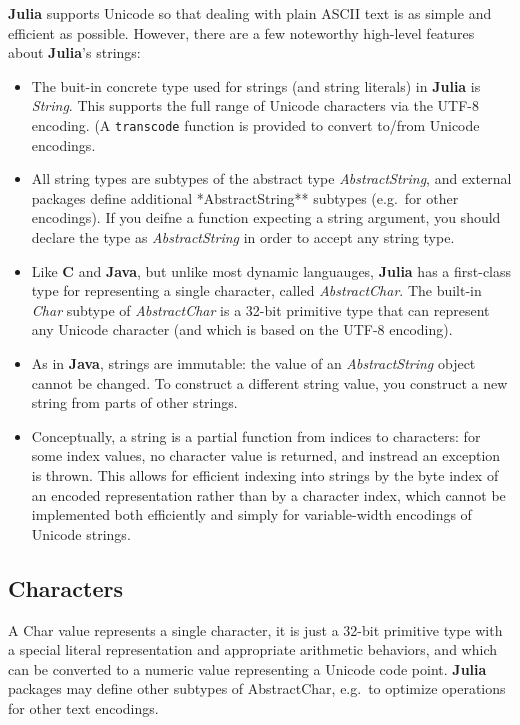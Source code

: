 \documentclass[
]{article}
\providecommand{\tightlist}{%
  \setlength{\itemsep}{0pt}\setlength{\parskip}{0pt}}
\begin{document}
\textbf{Julia} supports Unicode so that dealing with plain ASCII text is
as simple and efficient as possible. However, there are a few noteworthy
high-level features about \textbf{Julia}'s strings:

\begin{itemize}
\tightlist
\item
  The buit-in concrete type used for strings (and string literals) in
  \textbf{Julia} is \emph{String}. This supports the full range of
  Unicode characters via the UTF-8 encoding. (A \texttt{transcode}
  function is provided to convert to/from Unicode encodings.
\item
  All string types are subtypes of the abstract type
  \emph{AbstractString}, and external packages define additional
  *AbstractString** subtypes (e.g.~for other encodings). If you deifne a
  function expecting a string argument, you should declare the type as
  \emph{AbstractString} in order to accept any string type.
\item
  Like \textbf{C} and \textbf{Java}, but unlike most dynamic languauges,
  \textbf{Julia} has a first-class type for representing a single
  character, called \emph{AbstractChar}. The built-in \emph{Char}
  subtype of \emph{AbstractChar} is a 32-bit primitive type that can
  represent any Unicode character (and which is based on the UTF-8
  encoding).
\item
  As in \textbf{Java}, strings are immutable: the value of an
  \emph{AbstractString} object cannot be changed. To construct a
  different string value, you construct a new string from parts of other
  strings.
\item
  Conceptually, a string is a partial function from indices to
  characters: for some index values, no character value is returned, and
  instread an exception is thrown. This allows for efficient indexing
  into strings by the byte index of an encoded representation rather
  than by a character index, which cannot be implemented both
  efficiently and simply for variable-width encodings of Unicode
  strings.
\end{itemize}

\hypertarget{characters}{%
\subsection{Characters}\label{characters}}

A Char value represents a single character, it is just a 32-bit
primitive type with a special literal representation and appropriate
arithmetic behaviors, and which can be converted to a numeric value
representing a Unicode code point. \textbf{Julia} packages may define
other subtypes of AbstractChar, e.g.~to optimize operations for other
text encodings.
\end{document}
